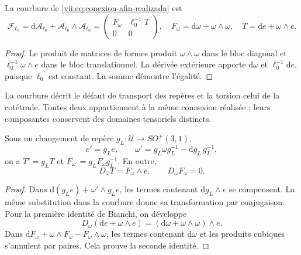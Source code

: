\begin{proposition}
\label{vii:prop:curvatura-afin}
La courbure de \eqref{vii:eq:conexion-afin-realizada} est
\begin{equation}
 \mathcal F_{\ell_0}
 =\mathrm d\mathcal A_{\ell_0}
   +\mathcal A_{\ell_0}\wedge\mathcal A_{\ell_0}
 =\begin{pmatrix}F_\omega&\ell_0^{-1}T\\0&0\end{pmatrix},
 \quad F_\omega=\mathrm d\omega+\omega\wedge\omega,
 \quad T=\mathrm de+\omega\wedge e.
 \label{vii:eq:curvatura-afin-realizada}
\end{equation}
\end{proposition}
\begin{proof}
Le produit de matrices de formes produit \(\omega\wedge\omega\) dans le bloc diagonal et \(\ell_0^{-1}\omega\wedge e\) dans le bloc translationnel. La dérivée extérieure apporte \(\mathrm d\omega\) et \(\ell_0^{-1}\mathrm de\), puisque \(\ell_0\) est constant. La somme démontre l'égalité.
\end{proof}

La courbure décrit le défaut de transport des repères et la torsion
celui de la cotétrade. Toutes deux appartiennent à la même connexion réalisée ;
leurs composantes conservent des domaines tensoriels distincts.

\begin{proposition}
\label{vii:prop:bianchi-cartan}
Sous un changement de repère \(g_L:\mathcal U\to SO^+(3,1)\),
\[
 e'=g_Le,\qquad
 \omega'=g_L\omega g_L^{-1}-\mathrm dg_L\,g_L^{-1},
\]
on a \(T'=g_LT\) et \(F_{\omega'}=g_LF_\omega g_L^{-1}\). En outre,
\begin{equation}
 D_\omega T=F_\omega\wedge e,\qquad D_\omega F_\omega=0.
 \label{vii:eq:bianchi-realizacion}
\end{equation}
\end{proposition}
\begin{proof}
Dans \(\mathrm d(g_Le)+\omega'\wedge g_Le\), les termes
contenant \(\mathrm dg_L\wedge e\) se compensent.
La même substitution dans la courbure donne sa transformation par
conjugaison. Pour la première identité de Bianchi, on développe
\[
 D_\omega(\mathrm de+\omega\wedge e)
 =(\mathrm d\omega+\omega\wedge\omega)\wedge e.
\]
Dans \(\mathrm dF_\omega+\omega\wedge F_\omega-F_\omega\wedge\omega\), les termes contenant \(\mathrm d\omega\) et les produits cubiques s'annulent par paires. Cela prouve la seconde identité.
\end{proof}

